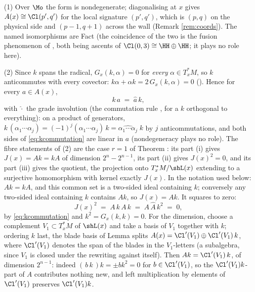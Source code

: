 (1) Over $\Mo$ the form is nondegenerate; diagonalising at $x$ gives $A(x) \cong \Cl(p', q')$ for the local signature $(p', q')$, which is $(p,q)$ on the physical side and $(p{-}1, q{+}1)$ across the wall (Remark \ref{rem:coords}). The named isomorphisms are Fact  (the coincidence of the two is the fusion phenomenon of \cite[Ex.~5.10]{ButlerT1}, both being ascents of $\Cl(0,3) \cong \HH \oplus \HH$; it plays no role here).

(2) Since $k$ spans the radical, $G_x(k, \alpha) = 0$ for \emph{every} $\alpha \in T^*_xM$, so $k$ anticommutes with every covector: $k\alpha + \alpha k = 2\,G_x(k,\alpha) = 0$ (). Hence for every $a \in A(x)$,
\begin{equation}\label{eq:kcommutation}
k\,a \;=\; \hat{a}\,k ,
\end{equation}
with $\hat{\cdot}$ the grade involution (the commutation rule , for a $k$ orthogonal to everything): on a product of generators, $k\,(\alpha_1 \cdots \alpha_j) = (-1)^j (\alpha_1 \cdots \alpha_j)\, k = \widehat{\alpha_1 \cdots \alpha_j}\; k$ by $j$ anticommutations, and both sides of \eqref{eq:kcommutation} are linear in $a$ (nondegeneracy plays no role). The fibre statements of (2) are the case $r = 1$ of Theorem : its part (i) gives $J(x) = Ak = kA$ of dimension $2^{n} - 2^{n-1}$, its part (ii) gives $J(x)^{2} = 0$, and its part (iii) gives the quotient, the projection onto $T^*_xM/\shL(x)$ extending to a surjective homomorphism with kernel exactly $J(x)$. In the notation used below: $A k = k A$, and this common set is a two-sided ideal containing $k$; conversely any two-sided ideal containing $k$ contains $Ak$, so $J(x) = Ak$. It squares to zero:
\[
J(x)^2 \;=\; A\,k\,A\,k \;=\; A\,\hat{A}\,k^2 \;=\; 0 ,
\]
by \eqref{eq:kcommutation} and $k^2 = G_x(k,k) = 0$. For the dimension, choose a complement $V_1 \subset T^*_xM$ of $\shL(x)$ and take a basis of $V_1$ together with $k$; ordering $k$ last, the blade basis of Lemma  splits $A(x) = \Cl'(V_1) \oplus \Cl'(V_1)\,k$, where $\Cl'(V_1)$ denotes the span of the blades in the $V_1$-letters (a subalgebra, since $V_1$ is closed under the rewriting against itself). Then $Ak = \Cl'(V_1)\,k$, of dimension $2^{n-1}$: indeed $(\,b\,k\,)k = \pm b k^2 = 0$ for $b \in \Cl'(V_1)$, so the $\Cl'(V_1)k$-part of $A$ contributes nothing new, and left multiplication by elements of $\Cl'(V_1)$ preserves $\Cl'(V_1)k$.

